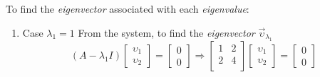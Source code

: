 \begin{remark}
    To find the \textit{eigenvector} associated with each \textit{eigenvalue}:
    
    \begin{enumerate}
        \item Case $\lambda_1 = 1$
            \subitem From the system, to find the \textit{eigenvector} ${\overrightarrow{\upsilon}}_{\lambda_1}$
            \begin{equation}
                (A - \lambda_1 I)
                \begin{bmatrix}
                    {\upsilon}_{1} \\
                    {\upsilon}_{2}
                \end{bmatrix}
                =
                \begin{bmatrix}
                    0 \\
                    0
                \end{bmatrix}
                \Rightarrow 
                \begin{bmatrix}
                    1 & 2 \\
                    2 & 4 \\
                \end{bmatrix}
                \begin{bmatrix}
                    {\upsilon}_{1} \\
                    {\upsilon}_{2}
                \end{bmatrix}
                =
                \begin{bmatrix}
                    0 \\
                    0
                \end{bmatrix}
            \end{equation}
            

\end{enumerate}
\end{remark}

